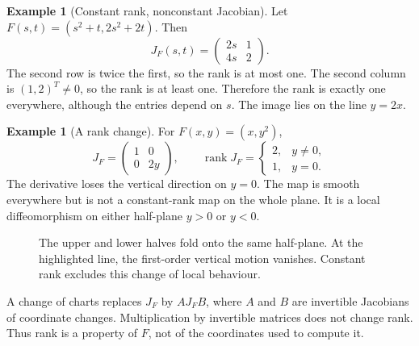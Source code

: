 \documentclass[11pt,a4paper]{article}
\numberwithin{equation}{section}
\theoremstyle{definition}
\newtheorem{example}[definition]{Example}
\theoremstyle{plain}
\theoremstyle{remark}
\newcommand{\rank}{\operatorname{rank}}
\begin{document}
\begin{example}[Constant rank, nonconstant Jacobian]
Let $F(s,t)=(s^2+t,2s^2+2t)$. Then
\[
J_F(s,t)=\begin{pmatrix}2s&1\\4s&2\end{pmatrix}.
\]
The second row is twice the first, so the rank is at most one. The second column is $(1,2)^T\ne0$, so the rank is at least one. Therefore the rank is exactly one everywhere, although the entries depend on $s$. The image lies on the line $y=2x$.
\end{example}

\begin{example}[A rank change]
For $F(x,y)=(x,y^2)$,
\[
J_F=\begin{pmatrix}1&0\\0&2y\end{pmatrix},\qquad
\rank J_F=\begin{cases}2,&y\ne0,\\1,&y=0.\end{cases}
\]
The derivative loses the vertical direction on $y=0$. The map is smooth everywhere but is not a constant-rank map on the whole plane. It is a local diffeomorphism on either half-plane $y>0$ or $y<0$.
\end{example}

\begin{figure}[htbp]\centering
{}
\caption{The upper and lower halves fold onto the same half-plane. At the highlighted line, the first-order vertical motion vanishes. Constant rank excludes this change of local behaviour.}
\end{figure}

A change of charts replaces $J_F$ by $A J_F B$, where $A$ and $B$ are invertible Jacobians of coordinate changes. Multiplication by invertible matrices does not change rank. Thus rank is a property of $F$, not of the coordinates used to compute it.
\end{document}

